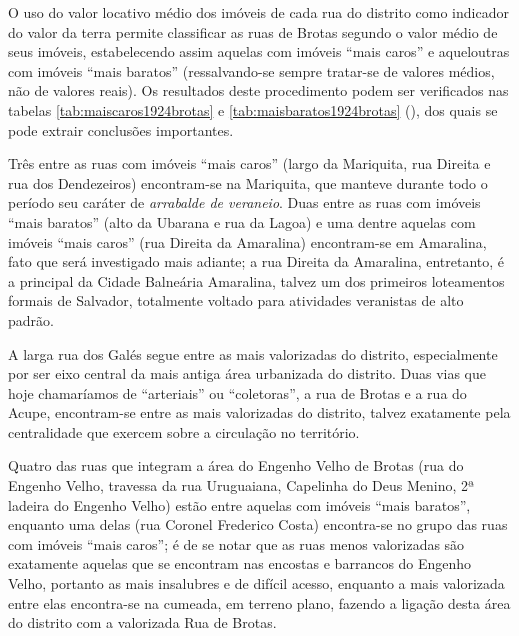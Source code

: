 

O uso do valor locativo médio dos imóveis de cada rua do distrito como indicador do valor da terra permite classificar as ruas de Brotas segundo o valor médio de seus imóveis, estabelecendo assim aquelas com imóveis ``mais caros'' e aqueloutras com imóveis ``mais baratos'' (ressalvando-se sempre tratar-se de valores médios, não de valores reais). Os resultados deste procedimento podem ser verificados nas tabelas \autoref{tab:maiscaros1924brotas} e \autoref{tab:maisbaratos1924brotas} (\pageref{tab:maisbaratos1924brotas}), dos quais se pode extrair conclusões importantes.





Três entre as ruas com imóveis ``mais caros'' (largo da Mariquita, rua Direita e rua dos Dendezeiros) encontram-se na Mariquita, que manteve durante todo o período seu caráter de \textit{arrabalde de veraneio}. Duas entre as ruas com imóveis ``mais baratos'' (alto da Ubarana e rua da Lagoa) e uma dentre aquelas com imóveis ``mais caros'' (rua Direita da Amaralina) encontram-se em Amaralina, fato que será investigado mais adiante; a rua Direita da Amaralina, entretanto, é a principal da Cidade Balneária Amaralina, talvez um dos primeiros loteamentos formais de Salvador, totalmente voltado para atividades veranistas de alto padrão.

A larga rua dos Galés segue entre as mais valorizadas do distrito, especialmente por ser eixo central da mais antiga área urbanizada do distrito. Duas vias que hoje chamaríamos de ``arteriais'' ou ``coletoras'', a rua de Brotas e a rua do Acupe, encontram-se entre as mais valorizadas do distrito, talvez exatamente pela centralidade que exercem sobre a circulação no território.

Quatro das ruas que integram a área do Engenho Velho de Brotas (rua do Engenho Velho, travessa da rua Uruguaiana, Capelinha do Deus Menino, 2ª ladeira do Engenho Velho) estão entre aquelas com imóveis ``mais baratos'', enquanto uma delas (rua Coronel Frederico Costa) encontra-se no grupo das ruas com imóveis ``mais caros''; é de se notar que as ruas menos valorizadas são exatamente aquelas que se encontram nas encostas e barrancos do Engenho Velho, portanto as mais insalubres e de difícil acesso, enquanto a mais valorizada entre elas encontra-se na cumeada, em terreno plano, fazendo a ligação desta área do distrito com a valorizada Rua de Brotas.

